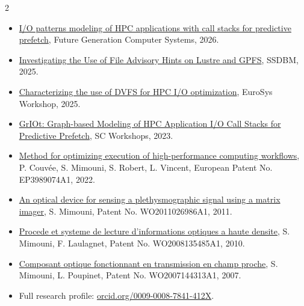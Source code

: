 \begin{multicols}{2}
{\small
\begin{itemize}
\item \href{https://doi.org/10.1016/j.future.2025.108034}{I/O patterns modeling of HPC applications with call stacks for predictive prefetch}, Future Generation Computer Systems, 2026.
\item \href{https://doi.org/10.1145/3733723.3733745}{Investigating the Use of File Advisory Hints on Lustre and GPFS}, SSDBM, 2025.
\item \href{https://doi.org/10.1145/3719330.3721227}{Characterizing the use of DVFS for HPC I/O optimization}, EuroSys Workshop, 2025.
\item \href{https://doi.org/10.1145/3624062.3624189}{GrIOt: Graph-based Modeling of HPC Application I/O Call Stacks for Predictive Prefetch}, SC Workshops, 2023.
\item \href{https://patents.google.com/patent/EP3989074A1/en}{Method for optimizing execution of high-performance computing workflows}, P. Couvée, S. Mimouni, S. Robert, L. Vincent, European Patent No. EP3989074A1, 2022.
\item \href{https://patents.google.com/patent/WO2011026986A1/en}{An optical device for sensing a plethysmographic signal using a matrix imager}, S. Mimouni, Patent No. WO2011026986A1, 2011.
\item \href{https://patents.google.com/patent/WO2008135485A1/fr}{Procede et systeme de lecture d'informations optiques a haute densite}, S. Mimouni, F. Laulagnet, Patent No. WO2008135485A1, 2010.
\item \href{https://patents.google.com/patent/WO2007144313A1/fr}{Composant optique fonctionnant en transmission en champ proche}, S. Mimouni, L. Poupinet, Patent No. WO2007144313A1, 2007.
\item Full research profile: \href{https://orcid.org/0009-0008-7841-412X}{orcid.org/0009-0008-7841-412X}.
\end{itemize}
}
\end{multicols}

